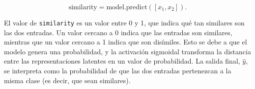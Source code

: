 \[
\text{similarity} = \text{model.predict}([x_1, x_2]).
\]

El valor de \texttt{similarity} es un valor entre 0 y 1, que indica qué tan similares son las dos entradas. Un valor cercano a 0 indica que las entradas son similares, mientras que un valor cercano a 1 indica que son disímiles. Esto se debe a que el modelo genera una probabilidad, y la activación sigmoidal transforma la distancia entre las representaciones latentes en un valor de probabilidad. La salida final, \( \hat{y} \), se interpreta como la probabilidad de que las dos entradas pertenezcan a la misma clase (es decir, que sean similares).

